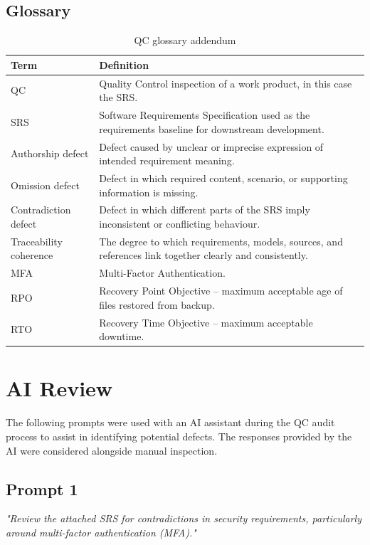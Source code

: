 \documentclass[11pt,a4paper]{article}
\begin{document}
\subsection{Glossary}

\begin{table}[H]
\centering
\small
\renewcommand{\arraystretch}{1.4}
\begin{tabularx}{\textwidth}{|p{}|X|}
\hline
\rowcolor{tableheader}
\textbf{Term} & \textbf{Definition} \\
\hline
QC & Quality Control inspection of a work product, in this case the SRS. \\
\hline
SRS & Software Requirements Specification used as the requirements baseline for downstream development. \\
\hline
Authorship defect & Defect caused by unclear or imprecise expression of intended requirement meaning. \\
\hline
Omission defect & Defect in which required content, scenario, or supporting information is missing. \\
\hline
Contradiction defect & Defect in which different parts of the SRS imply inconsistent or conflicting behaviour. \\
\hline
Traceability coherence & The degree to which requirements, models, sources, and references link together clearly and consistently. \\
\hline
MFA & Multi-Factor Authentication. \\
\hline
RPO & Recovery Point Objective -- maximum acceptable age of files restored from backup. \\
\hline
RTO & Recovery Time Objective -- maximum acceptable downtime. \\
\hline
\end{tabularx}
\caption{QC glossary addendum}
\label{tab:qc-glossary}
\end{table}

\section{AI Review}

The following prompts were used with an AI assistant during the QC audit process to assist in identifying potential defects. The responses provided by the AI were considered alongside manual inspection.

\subsection*{Prompt 1}
\textit{"Review the attached SRS for contradictions in security requirements, particularly around multi-factor authentication (MFA)."}
\end{document}
